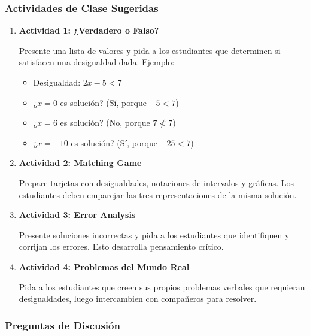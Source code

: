 \subsubsection*{Actividades de Clase Sugeridas}

\begin{enumerate}
    \item \textbf{Actividad 1: ¿Verdadero o Falso?}

    Presente una lista de valores y pida a los estudiantes que determinen si satisfacen una desigualdad dada. Ejemplo:
    \begin{itemize}
        \item Desigualdad: $2x - 5 < 7$
        \item ¿$x = 0$ es solución? (Sí, porque $-5 < 7$)
        \item ¿$x = 6$ es solución? (No, porque $7 \not< 7$)
        \item ¿$x = -10$ es solución? (Sí, porque $-25 < 7$)
    \end{itemize}

    \item \textbf{Actividad 2: Matching Game}

    Prepare tarjetas con desigualdades, notaciones de intervalos y gráficas. Los estudiantes deben emparejar las tres representaciones de la misma solución.

    \item \textbf{Actividad 3: Error Analysis}

    Presente soluciones incorrectas y pida a los estudiantes que identifiquen y corrijan los errores. Esto desarrolla pensamiento crítico.

    \item \textbf{Actividad 4: Problemas del Mundo Real}

    Pida a los estudiantes que creen sus propios problemas verbales que requieran desigualdades, luego intercambien con compañeros para resolver.
\end{enumerate}

\subsubsection*{Preguntas de Discusión}

